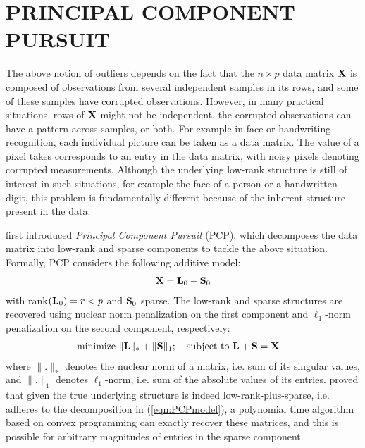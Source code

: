 \section*{\sffamily \Large PRINCIPAL COMPONENT PURSUIT}
\label{section:sec3}

The above notion of outliers depends on the fact that the $n \times p$ data matrix ${\mathbf{X}}$ is composed of observations from several independent samples in its rows, and some of these samples have corrupted observations. However, in many practical situations, rows of ${\mathbf{X}}$ might not be independent, the corrupted observations can have a pattern across samples, or both. For example in face or handwriting recognition, each individual picture can be taken as a data matrix. The value of a pixel takes corresponds to an entry in the data matrix, with noisy pixels denoting corrupted measurements. Although the underlying low-rank structure is still of interest in such situations, for example the face of a person or a handwritten digit, this problem is fundamentally different because of the inherent structure present in the data.

\cite{CandesEtal09} first introduced {\it Principal Component Pursuit} (PCP), which decomposes the data matrix into low-rank and sparse components to tackle the above situation. Formally, PCP considers the following additive model:
%
\begin{align}\label{eqn:PCPmodel}
{\mathbf{X}} = {\mathbf{L}}_0 + {\mathbf{S}}_0
\end{align}
%
with rank$({\mathbf{L}}_0) = r < p$ and ${\mathbf{S}}_0$ sparse. The low-rank and sparse structures are recovered using nuclear norm penalization on the first component and $\ell_1$-norm penalization on the second component, respectively:
%
\begin{align}\label{eqn:PCPobj}
& \text{minimize } \| {\mathbf{L}} \|_* + \| {\mathbf{S}} \|_1; \quad \text{subject to } {\mathbf{L}} + {\mathbf{S}} = {\mathbf{X}}
\end{align}
%
where $\|.\|_*$ denotes the nuclear norm of a matrix, i.e. sum of its singular values, and $\|.\|_1$ denotes $\ell_1$-norm, i.e. sum of the absolute values of its entries. \cite{CandesEtal09} proved that given the true underlying structure is indeed low-rank-plus-sparse, i.e. adheres to the decomposition in (\ref{eqn:PCPmodel}), a polynomial time algorithm based on convex programming can exactly recover these matrices, and this is possible for arbitrary magnitudes of entries in the sparse component.

